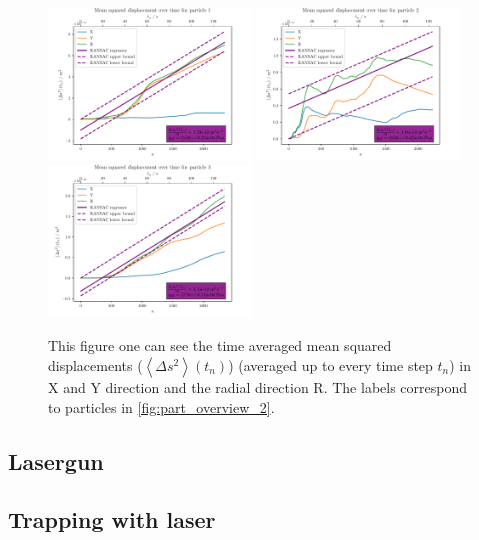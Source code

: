 \documentclass[12pt,english,ngerman]{scrartcl}
\begin{document}
\begin{figure}[H]
	\centering
	\includegraphics[width=0.48\textwidth]{figures/I2_particle_1.pdf}
	\includegraphics[width=0.48\textwidth]{figures/I2_particle_2.pdf}
	\includegraphics[width=0.48\textwidth]{figures/I2_particle_3.pdf}
	\caption[Time averaged mean squared displacements from the particles of the second
		capture]{This figure one can see the time averaged mean squared displacements
		($\left\langle \Delta s^2 \right\rangle(t_n)$) (averaged up to every time step
		$t_n$) in X and Y direction and the radial direction R. The labels correspond
		to particles in \autoref{fig:part_overview_2}.
	}\label{fig:part_second}
\end{figure}

\subsection{Lasergun}

\subsection{Trapping with laser}
\end{document}
